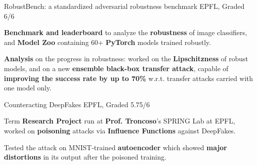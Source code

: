 

\begin{cventries}
  \cventry
  {RobustBench: a standardized adversarial robustness benchmark} %
  {} %
  {} %
  {EPFL, Graded 6/6} %
  {
    \begin{cvitems} %
      \item \textbf{Benchmark and leaderboard} to analyze the \textbf{robustness} of image classifiers, and \textbf{Model Zoo} containing 60+ \textbf{PyTorch} models trained robustly.
      \item \textbf{Analysis} on the progress in robustness: worked on the \textbf{Lipschitzness} of robust models, and on a new \textbf{ensemble black-box transfer attack}, capable of \textbf{improving the success rate by up to 70\%} w.r.t. transfer attacks carried with one model only.
    \end{cvitems}
  }
  
  \cventry
  {Counteracting DeepFakes} %
  {} %
  {} %
  {EPFL, Graded 5.75/6} %
  {
    \begin{cvitems} %
      \item Term \textbf{Research Project} run at \textbf{Prof. Troncoso}'s SPRING Lab at EPFL, worked on \textbf{poisoning} attacks via \textbf{Influence Functions} against DeepFakes.
      \item Tested the attack on MNIST-trained \textbf{autoencoder} which showed \textbf{major distortions} in its output after the poisoned training.
    \end{cvitems}
  }
  

\end{cventries}
